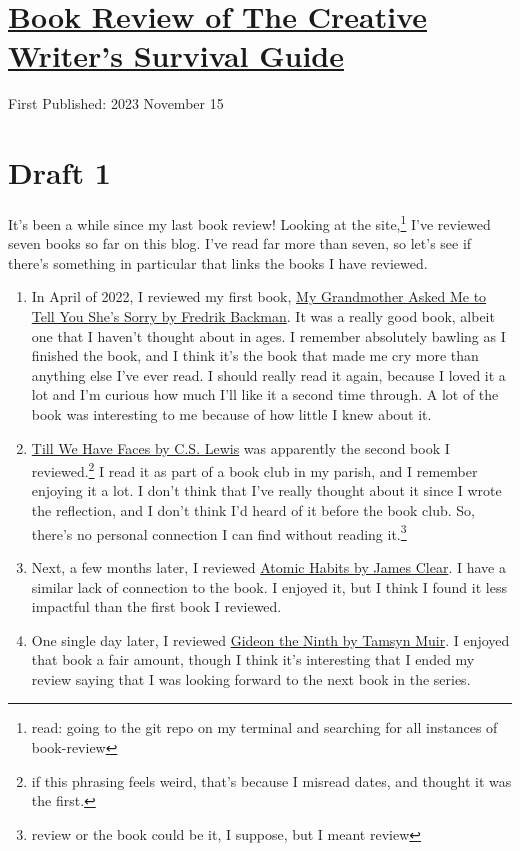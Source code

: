 \documentclass[12pt]{article}[titlepage]
\newcommand{\1}{\={a}}
\newcommand{\2}{\={e}}
\newcommand{\3}{\={\i}}
\newcommand{\4}{\=o}
\newcommand{\5}{\=u}
\newcommand{\6}{\={A}}
\renewcommand{\,}{\textsuperscript{,}}
\begin{document}
\doublespacing
\section{\href{book-review-creative-survivor.html}{Book Review of The Creative Writer's Survival Guide}}
First Published: 2023 November 15
\section{Draft 1}
It's been a while since my last book review!
Looking at the site,\footnote{read: going to the git repo on my terminal and searching for all instances of book-review} I've reviewed seven books so far on this blog.
I've read far more than seven, so let's see if there's something in particular that links the books I have reviewed.

\begin{enumerate}
\item In April of 2022, I reviewed my first book, \href{book-review-grandmother-sorry.html}{My Grandmother Asked Me to Tell You She's Sorry by Fredrik Backman}.
It was a really good book, albeit one that I haven't thought about in ages.
I remember absolutely bawling as I finished the book, and I think it's the book that made me cry more than anything else I've ever read.
I should really read it again, because I loved it a lot and I'm curious how much I'll like it a second time through.
A lot of the book was interesting to me because of how little I knew about it.
\item \href{book-review-faces-lewis.html}{Till We Have Faces by C.S. Lewis} was apparently the second book I reviewed.\footnote{if this phrasing feels weird, that's because I misread dates, and thought it was the first.}
I read it as part of a book club in my parish, and I remember enjoying it a lot.
I don't think that I've really thought about it since I wrote the reflection, and I don't think I'd heard of it before the book club.
So, there's no personal connection I can find without reading it.\footnote{review or the book could be it, I suppose, but I meant review}
\item Next, a few months later, I reviewed \href{book-review-atomic-habits.html}{Atomic Habits by James Clear}.
I have a similar lack of connection to the book.
I enjoyed it, but I think I found it less impactful than the first book I reviewed.
\item One single day later, I reviewed \href{book-review-gideon-ninth.html}{Gideon the Ninth by Tamsyn Muir}.
I enjoyed that book a fair amount, though I think it's interesting that I ended my review saying that I was looking forward to the next book in the series.

\end{enumerate}
\end{document}
